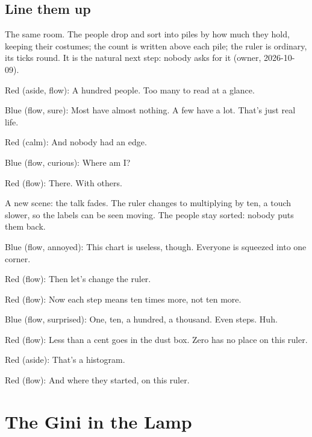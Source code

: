 \subsection{Line them up}\label{act:sort}

\label{sort}

The same room. The people drop and sort into piles by how much they hold,
keeping their costumes; the count is written above each pile; the ruler is
ordinary, its ticks round. It is the natural next step: nobody asks for it
(owner, 2026-10-09).

Red (aside, flow): A hundred people.
Too many to read at a glance.


Blue (flow, sure): Most have almost nothing. A few have a lot.
That's just real life.

Red (calm): And nobody had an edge.


Blue (flow, curious): Where am I?

Red (flow): There. With  others.


\label{ruler}

A new scene: the talk fades. The ruler changes to multiplying by ten, a
touch slower, so the labels can be seen moving. The people stay sorted:
nobody puts them back.

Blue (flow, annoyed): This chart is useless, though.
Everyone is squeezed into one corner.

Red (flow): Then let's change the ruler.


Red (flow): Now each step means ten times more,
not ten more.

Blue (flow, surprised): One, ten, a hundred, a thousand.
Even steps. Huh.

Red (flow): Less than a cent goes in the dust box.
Zero has no place on this ruler.

Red (aside): That's a \gls{histogram}.

Red (flow): And where they started, on this ruler.

\section{The Gini in the Lamp}\label{index:gini-in-the-lamp}


